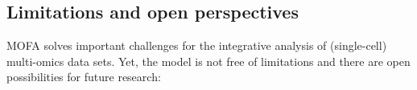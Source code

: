 


\newpage

\subsection{Limitations and open perspectives}

MOFA solves important challenges for the integrative analysis of (single-cell) multi-omics data sets. Yet, the model is not free of limitations and there are open possibilities for future research:

